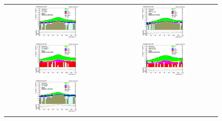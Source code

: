 \begin{figure}[htp]
  \begin{center}
    \begin{tabular}{cc}
      \includegraphics[width=0.45\textwidth]{figures/Zprime/2017/ScaleFactor/SameSign/nominal/stack_mee_Barrel_probes_PUW.png} &
      \includegraphics[width=0.45\textwidth]{figures/Zprime/2017/ScaleFactor/SameSign/nominal/stack_mee_Endcap_probes_PUW.png} \\
      \includegraphics[width=0.45\textwidth]{figures/Zprime/2017/ScaleFactor/SameSign/nominal/stack_mee_Barrel_pass_PUW.png} &
      \includegraphics[width=0.45\textwidth]{figures/Zprime/2017/ScaleFactor/SameSign/nominal/stack_mee_Endcap_pass_PUW.png}\\
      \includegraphics[width=0.45\textwidth]{figures/Zprime/2017/ScaleFactor/SameSign/nominal/stack_mee_Barrel_fail_PUW.png} &

\end{tabular}
\end{center}
\end{figure}
